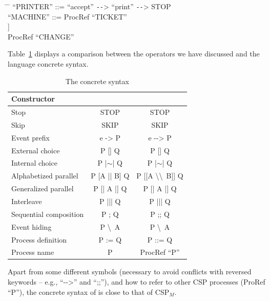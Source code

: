 \begin{tabbing}
	\hspace*{1em}\= \hspace*{6.4em} \= \kill	
	``PRINTER'' ::= ``accept'' \texttt{-{}-}> ``print'' \texttt{-{}-}> STOP\\

	``MACHINE'' ::= ProcRef ``TICKET''\\
	\>\> [[ \{\{``cash'', ``ticket''\}\} \textbackslash\textbackslash \ \{\{``cash'', ``change''\}\} ]]\\
	\>\> ProcRef ``CHANGE''
\end{tabbing}

Table~\ref{tab:cspm-csp_coq} displays a comparison between the \CSPM{} operators we have discussed and the \CSPcoq{} language concrete syntax.

\begin{table}[htb]
	\begin{center}
		\caption[The \CSPcoq{} concrete syntax]{The \CSPcoq{} concrete syntax}
		\label{tab:cspm-csp_coq}
		\begin{tabular}{ |l|c|c| }
			\hline
			Constructor & \CSPM{} & \CSPcoq{} \\
			\hline
			Stop & STOP & STOP \\ [0.5ex]
			Skip & SKIP & SKIP \\ [0.5ex]
			Event prefix & e -> P & e -{}-> P \\  [0.5ex]
			External choice & P [] Q & P [] Q \\  [0.5ex]
			Internal choice & P |$ \sim $| Q & P |$ \sim $| Q \\ [0.5ex]
			Alphabetized parallel & P [A || B] Q & P [[A \textbackslash\textbackslash \ B]] Q \\ [0.5ex]
			Generalized parallel & P [| A |] Q & P [| A |] Q \\ [0.5ex]
			Interleave & P ||| Q & P ||| Q \\ [0.5ex]
			Sequential composition & P ; Q & P ;; Q \\ [0.5ex]
			Event hiding & P \textbackslash \ A & P \textbackslash \ A \\ [0.5ex]
			Process definition & P := Q & P ::= Q \\ [0.5ex]
			Process name & P & ProcRef ``P'' \\ [0.5ex]
			\hline
		\end{tabular}
	\end{center}
\end{table}

Apart from some different symbols (necessary to avoid conflicts with reversed keywords -- e.g., ``-{}->'' and ``;;''), and how to refer to other CSP processes (ProRef ``P''), the concrete syntax of \CSPcoq{} is close to that of CSP$_{M}$.

